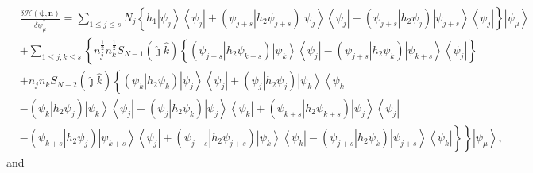 \documentclass[aps,preprint]{revtex4}%
\begin{document}
\begin{align}
&  \frac{\delta\mathcal{H}\left(  \mathbf{\psi,n}\right)  }{\delta\psi_{\mu
}^{\ast}}=\sum_{1\leq j\leq s}N_{j}\left\{  h_{1}\left\vert \psi
_{j}\right\rangle \left\langle \psi_{j}\right\vert +\left(  \left.  \psi
_{j+s}\right\vert h_{2}\psi_{j+s}\right)  \left\vert \psi_{j}\right\rangle
\left\langle \psi_{j}\right\vert -\left(  \left.  \psi_{j+s}\right\vert
h_{2}\psi_{j}\right)  \left\vert \psi_{j+s}\right\rangle \left\langle \psi
_{j}\right\vert \right\}  \left\vert \psi_{\mu}\right\rangle \nonumber\\
&  +\sum_{1\leq j,k\leq s}\left\{  n_{j}^{\frac{1}{2}}n_{k}^{\frac{1}{2}%
}S_{N-1}\left(  \hat{\jmath}\hat{k}\right)  \left\{  \left(  \left.
\psi_{j+s}\right\vert h_{2}\psi_{k+s}\right)  \left\vert \psi_{k}\right\rangle
\left\langle \psi_{j}\right\vert -\left(  \left.  \psi_{j+s}\right\vert
h_{2}\psi_{k}\right)  \left\vert \psi_{k+s}\right\rangle \left\langle \psi
_{j}\right\vert \right\}  \right. \nonumber\\
&  +n_{j}n_{k}S_{N-2}\left(  \hat{\jmath}\hat{k}\right)  \left\{  \left(
\left.  \psi_{k}\right\vert h_{2}\psi_{k}\right)  \left\vert \psi
_{j}\right\rangle \left\langle \psi_{j}\right\vert +\left(  \left.  \psi
_{j}\right\vert h_{2}\psi_{j}\right)  \left\vert \psi_{k}\right\rangle
\left\langle \psi_{k}\right\vert \right. \nonumber\\
&  -\left(  \left.  \psi_{k}\right\vert h_{2}\psi_{j}\right)  \left\vert
\psi_{k}\right\rangle \left\langle \psi_{j}\right\vert -\left(  \left.
\psi_{j}\right\vert h_{2}\psi_{k}\right)  \left\vert \psi_{j}\right\rangle
\left\langle \psi_{k}\right\vert +\left(  \left.  \psi_{k+s}\right\vert
h_{2}\psi_{k+s}\right)  \left\vert \psi_{j}\right\rangle \left\langle \psi
_{j}\right\vert \nonumber\\
&  -\left(  \left.  \psi_{k+s}\right\vert h_{2}\psi_{j}\right)  \left\vert
\psi_{k+s}\right\rangle \left\langle \psi_{j}\right\vert +\left(  \left.
\psi_{j+s}\right\vert h_{2}\psi_{j+s}\right)  \left\vert \psi_{k}\right\rangle
\left\langle \psi_{k}\right\vert -\left.  \left.  \overset{}{\left(  \left.
\psi_{j+s}\right\vert h_{2}\psi_{k}\right)  \left\vert \psi_{j+s}\right\rangle
\left\langle \psi_{k}\right\vert }\right\}  \right\}  \left\vert \psi_{\mu
}\right\rangle ,
\end{align}
and
\end{document}
